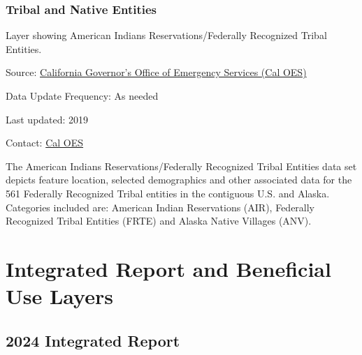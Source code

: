 \documentclass[
  letterpaper,
  DIV=11,
  numbers=noendperiod]{scrreprt}
\begin{document}
\subsubsection{Tribal and Native
Entities}\label{tribal-and-native-entities}

Layer showing American Indians Reservations/Federally Recognized Tribal
Entities.

Source:
\href{https://calema.maps.arcgis.com/apps/mapviewer/index.html?layers=0b6c3f61f0c04168b2de56ac321ab76d}{California
Governor's Office of Emergency Services (Cal OES)}

Data Update Frequency: As needed

Last updated: 2019

Contact:
\href{https://www.caloes.ca.gov/office-of-the-director/policy-administration/tribal-coordination/}{Cal
OES}

The American Indians Reservations/Federally Recognized Tribal Entities
data set depicts feature location, selected demographics and other
associated data for the 561 Federally Recognized Tribal entities in the
contiguous U.S. and Alaska. Categories included are: American Indian
Reservations (AIR), Federally Recognized Tribal Entities (FRTE) and
Alaska Native Villages (ANV).

\section{Integrated Report and Beneficial Use
Layers}\label{integrated-report-and-beneficial-use-layers}

\subsection{2024 Integrated Report}\label{integrated-report}
\end{document}
